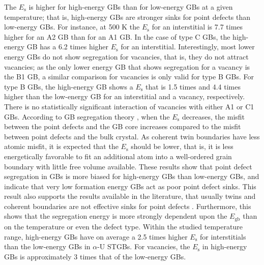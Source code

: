 \documentclass[review]{elsarticle}
\begin{document}
The $E_{\mathrm{s}}$ is higher for high-energy GBs than for low-energy GBs at a given temperature; that is, high-energy GBs are stronger sinks for point defects than low-energy GBs. For instance, at 500 K the $E_{\mathrm{s}}$ for an interstitial is 7.7 times higher for an A2 GB than for an A1 GB. In the case of type C GBs, the high-energy GB has a 6.2 times higher $E_{\mathrm{s}}$ for an interstitial. Interestingly, most lower energy GBs do not show segregation for vacancies, that is, they do not attract vacancies; as the only lower energy GB that shows segregation for a vacancy is the B1 GB, a similar comparison for vacancies is only valid for type B GBs. For type B GBs, the high-energy GB shows a $E_{\mathrm{s}}$ that is 1.5 times and 4.4 times higher than the low-energy GB for an interstitial and a vacancy, respectively. There is no statistically significant interaction of vacancies with either A1 or C1 GBs. According to GB segregation theory \cite{MISHIN_gb_diff}, when the $E_{\mathrm{s}}$ decreases, the misfit between the point defects and the GB core increases compared to the misfit between point defects and the bulk crystal. As coherent twin boundaries have less atomic misfit, it is expected that the $E_{\mathrm{s}}$ should be lower, that is, it is less energetically favorable to fit an additional atom into a well-ordered grain boundary with little free volume available. These results show that point defect segregation in GBs is more biased for high-energy GBs than low-energy GBs, and indicate that very low formation energy GBs act as poor point defect sinks. This result also supports the results available in the literature, that usually twins and coherent boundaries are not effective sinks for point defects \cite{Nabarro}. Furthermore, this shows that the segregation energy is more strongly dependent upon the  $E_{\mathrm{gb}}$  than on the temperature or even the defect type. Within the studied temperature range, high-energy GBs have on average a 2.5 times higher $E_{\mathrm{s}}$ for interstitials than the low-energy GBs in $\alpha$-U STGBs. For vacancies, the $E_{\mathrm{s}}$ in high-energy GBs is approximately 3 times that of the low-energy GBs.

\end{document}
